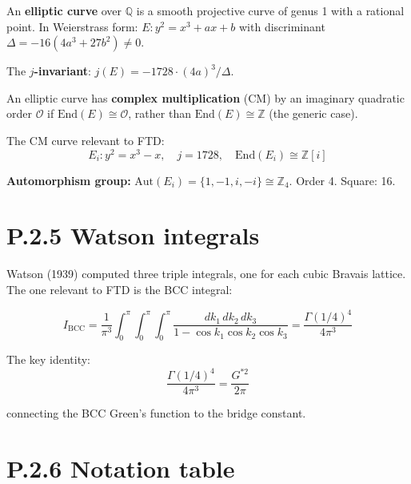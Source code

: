 \documentclass[
  11pt,
  letterpaper,
  twoside,
  openright]{book}
\begin{document}
An \textbf{elliptic curve} over \(\mathbb{Q}\) is a smooth projective
curve of genus 1 with a rational point. In Weierstrass form:
\(E: y^2 = x^3 + ax + b\) with discriminant
\(\Delta = -16(4a^3 + 27b^2) \neq 0\).

The \textbf{\(j\)-invariant}: \(j(E) = -1728 \cdot (4a)^3 / \Delta\).

An elliptic curve has \textbf{complex multiplication} (CM) by an
imaginary quadratic order \(\mathcal{O}\) if
\(\text{End}(E) \cong \mathcal{O}\), rather than
\(\text{End}(E) \cong \mathbb{Z}\) (the generic case).

The CM curve relevant to FTD: \[
E_i: y^2 = x^3 - x, \quad j = 1728, \quad \text{End}(E_i) \cong \mathbb{Z}[i]
\tag{P.10}
\]

\textbf{Automorphism group:}
\(\text{Aut}(E_i) = \{1, -1, i, -i\} \cong \mathbb{Z}_4\). Order 4.
Square: 16.

\section{P.2.5 Watson integrals}\label{p.2.5-watson-integrals}

Watson (1939) computed three triple integrals, one for each cubic
Bravais lattice. The one relevant to FTD is the BCC integral:

\[
I_{\text{BCC}} = \frac{1}{\pi^3} \int_0^\pi \!\! \int_0^\pi \!\! \int_0^\pi \frac{dk_1 \, dk_2 \, dk_3}{1 - \cos k_1 \cos k_2 \cos k_3} = \frac{\Gamma(1/4)^4}{4\pi^3}
\tag{P.11}
\]

The key identity: \[
\frac{\Gamma(1/4)^4}{4\pi^3} = \frac{G^{*2}}{2\pi}
\tag{P.12}
\]

connecting the BCC Green's function to the bridge constant.

\section{P.2.6 Notation table}\label{p.2.6-notation-table}
\end{document}
